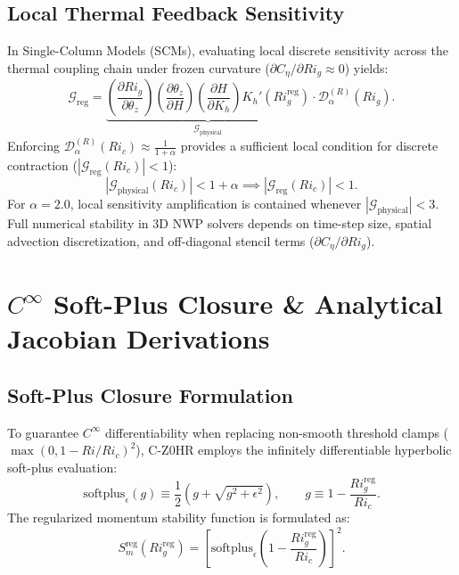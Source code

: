 \documentclass[11pt,a4paper]{article}
\begin{document}
\subsection{Local Thermal Feedback Sensitivity}
In Single-Column Models (SCMs), evaluating local discrete sensitivity across the thermal coupling chain under frozen curvature ($\partial C_\eta / \partial Ri_g \approx 0$) yields:
\begin{equation}
\mathcal{G}_{\text{reg}} = \underbrace{\left(\frac{\partial Ri_g}{\partial \theta_z}\right) \left(\frac{\partial \theta_z}{\partial H}\right) \left(\frac{\partial H}{\partial K_h}\right) K_h'\left(Ri_g^{\text{reg}}\right)}_{\mathcal{G}_{\text{physical}}} \cdot \mathcal{D}_\alpha^{(R)}(Ri_g).
\end{equation}
Enforcing $\mathcal{D}_\alpha^{(R)}(Ri_c) \approx \frac{1}{1+\alpha}$ provides a sufficient local condition for discrete contraction ($|\mathcal{G}_{\text{reg}}(Ri_c)| < 1$):
\begin{equation}
\left|\mathcal{G}_{\text{physical}}(Ri_c)\right| < 1 + \alpha \implies \left|\mathcal{G}_{\text{reg}}(Ri_c)\right| < 1.
\end{equation}
For $\alpha = 2.0$, local sensitivity amplification is contained whenever $|\mathcal{G}_{\text{physical}}| < 3$. Full numerical stability in 3D NWP solvers depends on time-step size, spatial advection discretization, and off-diagonal stencil terms ($\partial C_\eta / \partial Ri_g$).

\section{$C^\infty$ Soft-Plus Closure \& Analytical Jacobian Derivations}

\subsection{Soft-Plus Closure Formulation}
To guarantee $C^\infty$ differentiability when replacing non-smooth threshold clamps ($\max(0, 1 - Ri/Ri_c)^2$), C-Z0HR employs the infinitely differentiable hyperbolic soft-plus evaluation:
\begin{equation}
\text{softplus}_\epsilon(g) \equiv \frac{1}{2} \left( g + \sqrt{g^2 + \epsilon^2} \right), \qquad g \equiv 1 - \frac{Ri_g^{\text{reg}}}{Ri_c}.
\label{eq:softplus_def}
\end{equation}
The regularized momentum stability function is formulated as:
\begin{equation}
S_m^{\text{reg}}\left(Ri_g^{\text{reg}}\right) = \left[ \text{softplus}_\epsilon\left( 1 - \frac{Ri_g^{\text{reg}}}{Ri_c} \right) \right]^2.
\label{eq:sm_softplus}
\end{equation}
\end{document}
